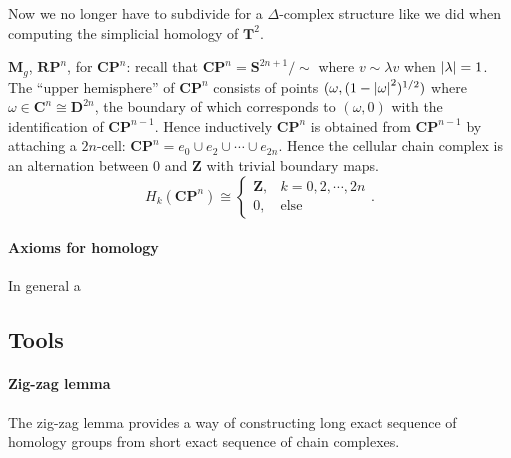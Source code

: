\documentclass[11pt]{article}
\theoremstyle{definition}
\theoremstyle{plain}
\newcommand{\Z}{\mathbf{Z}}
\newcommand{\1}{\mathbf{1}}
\begin{document}
Now we no longer have to subdivide for a $\Delta$-complex structure like we did when computing the simplicial homology of $\mathbf{T}^2$.\medbreak

$\mathbf{M}_g$, $\mathbf{RP}^n$, for $\mathbf{CP}^n$: recall that $\mathbf{CP}^n=\mathbf{S}^{2n+1}/\sim$ where $v\sim\lambda v$ when $\abs{\lambda}=1$. The ``upper hemisphere'' of $\mathbf{CP}^n$ consists of points $(\omega,(1-\abs{\omega}^2)^{1/2})$ where $\omega\in\mathbf{C}^n\cong\mathbf{D}^{2n}$, the boundary of which corresponds to $(\omega,0)$ with the identification of $\mathbf{CP}^{n-1}$. Hence inductively $\mathbf{CP}^n$ is obtained from $\mathbf{CP}^{n-1}$ by attaching a $2n$-cell: $\mathbf{CP}^n=e_0\cup e_2\cup\cdots\cup e_{2n}$. Hence the cellular chain complex is an alternation between $0$ and $\Z$ with trivial boundary maps.
\[H_k(\mathbf{CP}^n)\cong\begin{cases}
\Z,&k=0,2,\cdots,2n\\0,&\textrm{else}
\end{cases}.\]

\paragraph{Axioms for homology}

In general a

\newpage
\subsection{Tools}

\paragraph{Zig-zag lemma}

The zig-zag lemma provides a way of constructing long exact sequence of homology groups from short exact sequence of chain complexes.
\end{document}
